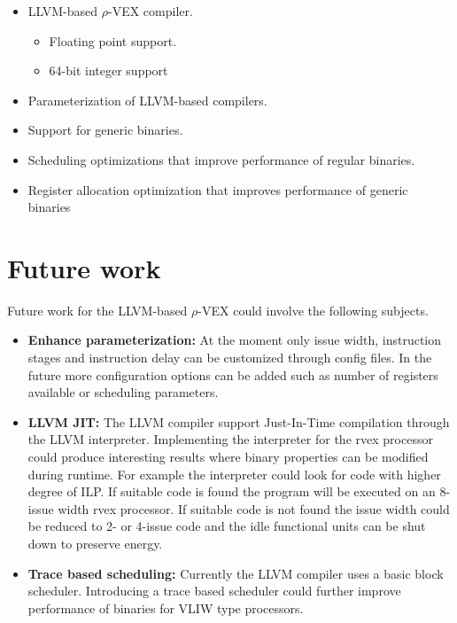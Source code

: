 \begin{itemize}
	\item LLVM-based $\rho$-VEX compiler.
	\begin{itemize}
		\item Floating point support.
		\item 64-bit integer support
	\end{itemize}
	\item Parameterization of LLVM-based compilers.
	\item Support for generic binaries.
	\item Scheduling optimizations that improve performance of regular binaries.
	\item Register allocation optimization that improves performance of generic binaries
\end{itemize}

\section{Future work}
Future work for the LLVM-based $\rho$-VEX could involve the following subjects.

\begin{itemize}
	\item \textbf{Enhance parameterization:} At the moment only issue width, instruction stages and instruction delay can be customized through config files. In the future more configuration options can be added such as number of registers available or scheduling parameters.

	\item \textbf{LLVM JIT:} The LLVM compiler support Just-In-Time compilation through the LLVM interpreter. Implementing the interpreter for the rvex processor could produce interesting results where binary properties can be modified during runtime. For example the interpreter could look for code with higher degree of ILP. If suitable code is found the program will be executed on an 8-issue width rvex processor. If suitable code is not found the issue width could be reduced to 2- or 4-issue code and the idle functional units can be shut down to preserve energy.

	\item \textbf{Trace based scheduling:} Currently the LLVM compiler uses a basic block scheduler. Introducing a trace based scheduler could further improve performance of binaries for VLIW type processors.

\end{itemize}

\acresetall